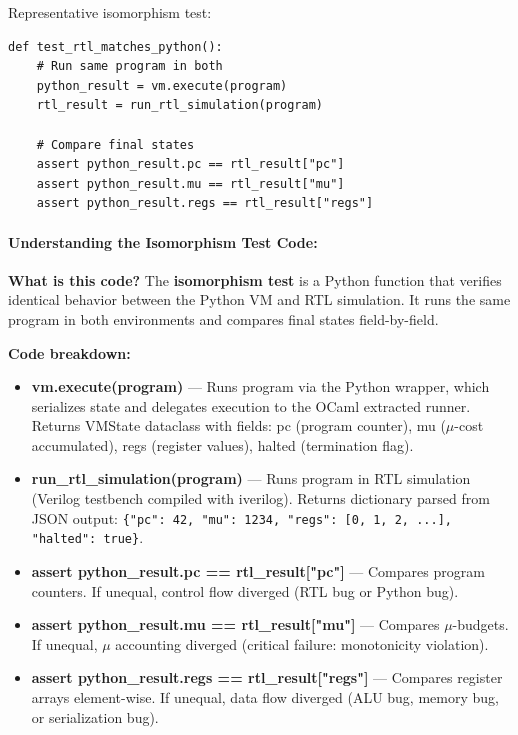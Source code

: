Representative isomorphism test:
\begin{lstlisting}
def test_rtl_matches_python():
    # Run same program in both
    python_result = vm.execute(program)
    rtl_result = run_rtl_simulation(program)
    
    # Compare final states
    assert python_result.pc == rtl_result["pc"]
    assert python_result.mu == rtl_result["mu"]
    assert python_result.regs == rtl_result["regs"]
\end{lstlisting}

\paragraph{Understanding the Isomorphism Test Code:}

\textbf{What is this code?} The \textbf{isomorphism test} is a Python function that verifies identical behavior between the Python VM and RTL simulation. It runs the same program in both environments and compares final states field-by-field.

\textbf{Code breakdown:}
\begin{itemize}
    \item \textbf{vm.execute(program)} --- Runs program via the Python wrapper, which serializes state and delegates execution to the OCaml extracted runner. Returns VMState dataclass with fields: pc (program counter), mu ($\mu$-cost accumulated), regs (register values), halted (termination flag).
    
    \item \textbf{run\_rtl\_simulation(program)} — Runs program in RTL simulation (Verilog testbench compiled with iverilog). Returns dictionary parsed from JSON output: \texttt{\{"pc": 42, "mu": 1234, "regs": [0, 1, 2, ...], "halted": true\}}.
    
    \item \textbf{assert python\_result.pc == rtl\_result["pc"]} — Compares program counters. If unequal, control flow diverged (RTL bug or Python bug).
    
    \item \textbf{assert python\_result.mu == rtl\_result["mu"]} — Compares $\mu$-budgets. If unequal, $\mu$ accounting diverged (critical failure: monotonicity violation).
    
    \item \textbf{assert python\_result.regs == rtl\_result["regs"]} — Compares register arrays element-wise. If unequal, data flow diverged (ALU bug, memory bug, or serialization bug).
\end{itemize}

